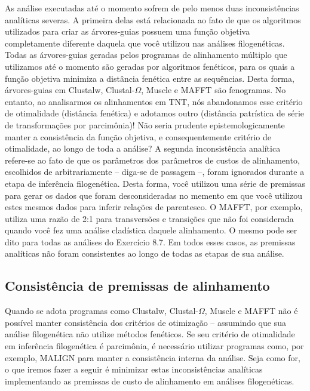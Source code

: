\begin{refsection}
As análise executadas até o momento sofrem de pelo menos duas inconsistências analíticas severas. A primeira delas está relacionada ao fato de que os algoritmos utilizados para criar as árvores-guias possuem uma função objetiva completamente diferente daquela que você utilizou nas análises filogenéticas. Todas as árvores-guias geradas pelos programas de alinhamento múltiplo que utilizamos até o momento são geradas por algoritmos fenéticos, para os quais a função objetiva minimiza a distância fenética entre as sequências. Desta forma, árvores-guias em Clustalw, Clustal-$\Omega$, Muscle e MAFFT são fenogramas. No entanto, ao analisarmos os alinhamentos em TNT, nós abandonamos esse critério de otimalidade (distância fenética) e adotamos outro (distância patrística de série de transformações por parcimônia)! Não seria prudente epistemologicamente manter a consistência da função objetiva, e consequentemente critério de otimalidade, ao longo de toda a análise? A segunda inconsistência analítica refere-se ao fato de que os parâmetros dos parâmetros de custos de alinhamento, escolhidos de arbitrariamente -- diga-se de passagem --, foram ignorados durante a etapa de inferência filogenética. Desta forma, você utilizou uma série de premissas para gerar os dados que foram desconsideradas no memento em que você utilizou estes mesmos dados para inferir relações de parentesco. O MAFFT, por exemplo, utiliza uma razão de 2:1 para transversões e transições que não foi considerada quando você fez uma análise cladística daquele alinhamento. O mesmo pode ser dito para todas as análises do Exercício 8.7. Em todos esses casos, as premissas analíticas não foram consistentes ao longo de todas as etapas de sua análise.

\subsection{Consistência de premissas de alinhamento}\label{tut8:consistency:par}

Quando se adota programas como Clustalw, Clustal-$\Omega$, Muscle e MAFFT não é possível manter consistência dos critérios de otimização -- assumindo que sua análise filogenética não utilize métodos fenéticos. Se seu critério de otimalidade em inferência filogenética é parcimônia, é necessário utilizar programas como, por exemplo, MALIGN \parencite{Wheeler_and_Gladstein_1994} para manter a consistência interna da análise. Seja como for, o que iremos fazer a seguir é minimizar estas inconsistências analíticas implementando as premissas de custo de alinhamento em análises filogenéticas.


\end{refsection}
